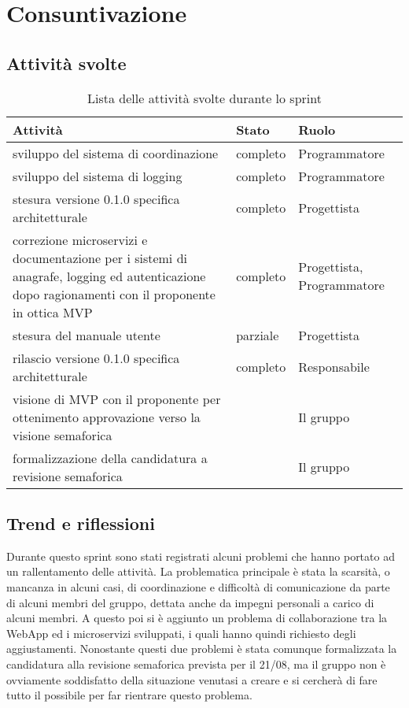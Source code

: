 \section{Consuntivazione}

\subsection{Attività svolte}

\begin{table}[H]
    \begin{xltabular}{\textwidth}{X l l}

         \textbf{Attività} & \textbf{Stato} & \textbf{Ruolo}\\
        \endhead
        \hline
        sviluppo del sistema di coordinazione & completo & Programmatore \\
        sviluppo del sistema di logging & completo & Programmatore \\
        stesura versione 0.1.0 specifica architetturale & completo & Progettista\\
        correzione microservizi e documentazione per i sistemi di anagrafe, logging ed autenticazione dopo ragionamenti con il proponente in ottica MVP & completo & Progettista, Programmatore \\
        stesura del manuale utente & parziale & Progettista \\
        rilascio versione 0.1.0 specifica architetturale & completo & Responsabile \\
        visione di MVP con il proponente per ottenimento approvazione verso la visione semaforica & & Il gruppo \\
        formalizzazione della candidatura a revisione semaforica & & Il gruppo \\
    \end{xltabular}
    \caption{Lista delle attività svolte durante lo sprint}
\end{table}

\subsection{Trend e riflessioni}\label{subsec:trend}

Durante questo sprint sono stati registrati alcuni problemi che hanno portato ad un rallentamento delle attività. La problematica principale è stata la scarsità, o mancanza in alcuni casi, di coordinazione e difficoltà di comunicazione da parte di alcuni membri del gruppo, dettata anche da impegni personali a carico di alcuni membri. A questo poi si è aggiunto un problema di collaborazione tra la WebApp ed i microservizi sviluppati, i quali hanno quindi richiesto degli aggiustamenti. Nonostante questi due problemi è stata comunque formalizzata la candidatura alla revisione semaforica prevista per il 21/08, ma il gruppo non è ovviamente soddisfatto della situazione venutasi a creare e si cercherà di fare tutto il possibile per far rientrare questo problema.

